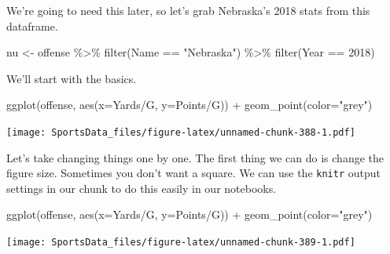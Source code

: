 \documentclass[
]{book}
\newenvironment{Shaded}{\begin{snugshade}}{\end{snugshade}}
\newcommand{\AttributeTok}[1]{\textcolor[rgb]{0.77,0.63,0.00}{#1}}
\newcommand{\DecValTok}[1]{\textcolor[rgb]{0.00,0.00,0.81}{#1}}
\newcommand{\FunctionTok}[1]{\textcolor[rgb]{0.00,0.00,0.00}{#1}}
\newcommand{\NormalTok}[1]{#1}
\newcommand{\OtherTok}[1]{\textcolor[rgb]{0.56,0.35,0.01}{#1}}
\newcommand{\SpecialCharTok}[1]{\textcolor[rgb]{0.00,0.00,0.00}{#1}}
\newcommand{\StringTok}[1]{\textcolor[rgb]{0.31,0.60,0.02}{#1}}
\begin{document}
We're going to need this later, so let's grab Nebraska's 2018 stats from this dataframe.

\begin{Shaded}
\begin{Highlighting}[]
\NormalTok{nu }\OtherTok{\textless{}{-}}\NormalTok{ offense }\SpecialCharTok{\%\textgreater{}\%} \FunctionTok{filter}\NormalTok{(Name }\SpecialCharTok{==} \StringTok{"Nebraska"}\NormalTok{) }\SpecialCharTok{\%\textgreater{}\%} \FunctionTok{filter}\NormalTok{(Year }\SpecialCharTok{==} \DecValTok{2018}\NormalTok{)}
\end{Highlighting}
\end{Shaded}

We'll start with the basics.

\begin{Shaded}
\begin{Highlighting}[]
\FunctionTok{ggplot}\NormalTok{(offense, }\FunctionTok{aes}\NormalTok{(}\AttributeTok{x=}\StringTok{\textasciigrave{}}\AttributeTok{Yards/G}\StringTok{\textasciigrave{}}\NormalTok{, }\AttributeTok{y=}\StringTok{\textasciigrave{}}\AttributeTok{Points/G}\StringTok{\textasciigrave{}}\NormalTok{)) }\SpecialCharTok{+} 
  \FunctionTok{geom\_point}\NormalTok{(}\AttributeTok{color=}\StringTok{"grey"}\NormalTok{)}
\end{Highlighting}
\end{Shaded}

\texttt{[image: SportsData\_files/figure-latex/unnamed-chunk-388-1.pdf]}

Let's take changing things one by one. The first thing we can do is change the figure size. Sometimes you don't want a square. We can use the \texttt{knitr} output settings in our chunk to do this easily in our notebooks.

\begin{Shaded}
\begin{Highlighting}[]
\FunctionTok{ggplot}\NormalTok{(offense, }\FunctionTok{aes}\NormalTok{(}\AttributeTok{x=}\StringTok{\textasciigrave{}}\AttributeTok{Yards/G}\StringTok{\textasciigrave{}}\NormalTok{, }\AttributeTok{y=}\StringTok{\textasciigrave{}}\AttributeTok{Points/G}\StringTok{\textasciigrave{}}\NormalTok{)) }\SpecialCharTok{+} 
  \FunctionTok{geom\_point}\NormalTok{(}\AttributeTok{color=}\StringTok{"grey"}\NormalTok{)}
\end{Highlighting}
\end{Shaded}

\texttt{[image: SportsData\_files/figure-latex/unnamed-chunk-389-1.pdf]}
\end{document}
